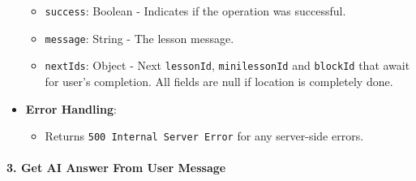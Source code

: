 \begin{itemize}
  \begin{itemize}
  \tightlist
  \item
    \texttt{success}: Boolean - Indicates if the operation was
    successful.
  \item
    \texttt{message}: String - The lesson message.
  \item
    \texttt{nextIds}: Object - Next \texttt{lessonId},
    \texttt{minilessonId} and \texttt{blockId} that await for user's
    completion. All fields are null if location is completely done.
  \end{itemize}
\item
  \textbf{Error Handling}:

  \begin{itemize}
  \tightlist
  \item
    Returns \texttt{500\ Internal\ Server\ Error} for any server-side
    errors.
  \end{itemize}
\end{itemize}

\hypertarget{get-ai-answer-from-user-message}{%
\paragraph{3. Get AI Answer From User
Message}\label{get-ai-answer-from-user-message}}

